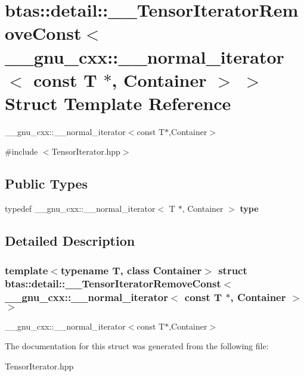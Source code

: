 \hypertarget{structbtas_1_1detail_1_1_____tensor_iterator_remove_const_3_01____gnu__cxx_1_1____normal__iterat04b796acad14e611539eaba159f96d30}{
\section{btas::detail::\_\-\_\-TensorIteratorRemoveConst$<$ \_\-\_\-gnu\_\-cxx::\_\-\_\-normal\_\-iterator$<$ const T $\ast$, Container $>$ $>$ Struct Template Reference}
\label{structbtas_1_1detail_1_1_____tensor_iterator_remove_const_3_01____gnu__cxx_1_1____normal__iterat04b796acad14e611539eaba159f96d30}
}


\_\-\_\-gnu\_\-cxx::\_\-\_\-normal\_\-iterator$<$const T$\ast$,Container$>$  


{\ttfamily \#include $<$TensorIterator.hpp$>$}\subsection*{Public Types}
\begin{DoxyCompactItemize}
\item 
\hypertarget{structbtas_1_1detail_1_1_____tensor_iterator_remove_const_3_01____gnu__cxx_1_1____normal__iterat04b796acad14e611539eaba159f96d30_afaadb38f8830d946e94384fd3895c405}{
typedef \_\-\_\-gnu\_\-cxx::\_\-\_\-normal\_\-iterator$<$ T $\ast$, Container $>$ {\bfseries type}}
\label{structbtas_1_1detail_1_1_____tensor_iterator_remove_const_3_01____gnu__cxx_1_1____normal__iterat04b796acad14e611539eaba159f96d30_afaadb38f8830d946e94384fd3895c405}

\end{DoxyCompactItemize}


\subsection{Detailed Description}
\subsubsection*{template$<$typename T, class Container$>$ struct btas::detail::\_\-\_\-TensorIteratorRemoveConst$<$ \_\-\_\-gnu\_\-cxx::\_\-\_\-normal\_\-iterator$<$ const T $\ast$, Container $>$ $>$}

\_\-\_\-gnu\_\-cxx::\_\-\_\-normal\_\-iterator$<$const T$\ast$,Container$>$ 

The documentation for this struct was generated from the following file:\begin{DoxyCompactItemize}
\item 
TensorIterator.hpp\end{DoxyCompactItemize}

